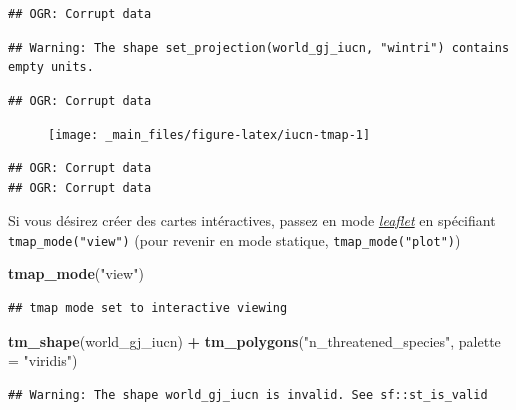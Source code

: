 \documentclass[]{book}
\newenvironment{Shaded}{\begin{snugshade}}{\end{snugshade}}
\newcommand{\DataTypeTok}[1]{\textcolor[rgb]{0.13,0.29,0.53}{#1}}
\newcommand{\KeywordTok}[1]{\textcolor[rgb]{0.13,0.29,0.53}{\textbf{#1}}}
\newcommand{\NormalTok}[1]{#1}
\newcommand{\OperatorTok}[1]{\textcolor[rgb]{0.81,0.36,0.00}{\textbf{#1}}}
\newcommand{\StringTok}[1]{\textcolor[rgb]{0.31,0.60,0.02}{#1}}
\begin{document}
\begin{verbatim}
## OGR: Corrupt data
\end{verbatim}

\begin{verbatim}
## Warning: The shape set_projection(world_gj_iucn, "wintri") contains empty units.
\end{verbatim}

\begin{verbatim}
## OGR: Corrupt data
\end{verbatim}

\begin{figure}

{\centering \texttt{[image: \_main\_files/figure-latex/iucn-tmap-1]} 

}

\caption{ }\label{fig:iucn-tmap}
\end{figure}

\begin{verbatim}
## OGR: Corrupt data
## OGR: Corrupt data
\end{verbatim}

Si vous désirez créer des cartes intéractives, passez en mode
\href{https://rstudio.github.io/leaflet/}{\emph{leaflet}} en spécifiant
\texttt{tmap\_mode("view")} (pour revenir en mode statique,
\texttt{tmap\_mode("plot")})

\begin{Shaded}
\begin{Highlighting}[]
\KeywordTok{tmap_mode}\NormalTok{(}\StringTok{"view"}\NormalTok{)}
\end{Highlighting}
\end{Shaded}

\begin{verbatim}
## tmap mode set to interactive viewing
\end{verbatim}

\begin{Shaded}
\begin{Highlighting}[]
\KeywordTok{tm_shape}\NormalTok{(world_gj_iucn) }\OperatorTok{+}
\StringTok{  }\KeywordTok{tm_polygons}\NormalTok{(}\StringTok{"n_threatened_species"}\NormalTok{, }\DataTypeTok{palette =} \StringTok{"viridis"}\NormalTok{)}
\end{Highlighting}
\end{Shaded}

\begin{verbatim}
## Warning: The shape world_gj_iucn is invalid. See sf::st_is_valid
\end{verbatim}
\end{document}
